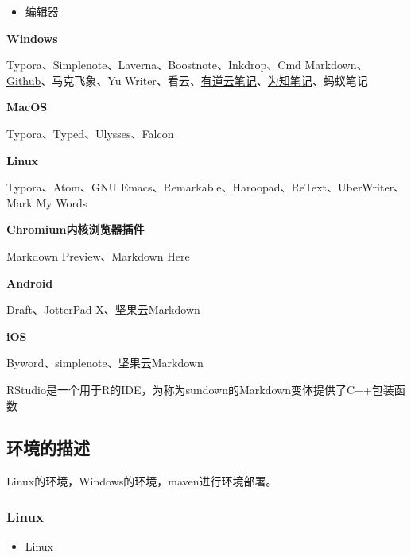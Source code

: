 \documentclass[
]{article}
\begin{document}
\begin{itemize}
\item
  编辑器
\end{itemize}

\textbf{Windows}

Typora、Simplenote、Laverna、Boostnote、Inkdrop、Cmd
Markdown、\href{https://baike.baidu.com/item/Github/10145341}{Github}、马克飞象、Yu
Writer、看云、\href{https://baike.baidu.com/item/有道云笔记/3689874}{有道云笔记}、\href{https://baike.baidu.com/item/为知笔记/552096}{为知笔记}、蚂蚁笔记

\textbf{MacOS}

Typora、Typed、Ulysses、Falcon

\textbf{Linux}

Typora、Atom、GNU Emacs、Remarkable、Haroopad、ReText、UberWriter、Mark
My Words

\textbf{Chromium内核浏览器插件}

Markdown Preview、Markdown Here

\textbf{Android}

Draft、JotterPad X、坚果云Markdown

\textbf{iOS}

Byword、simplenote、坚果云Markdown

RStudio是一个用于R的IDE，为称为sundown的Markdown变体提供了C++包装函数

\hypertarget{ux73afux5883ux7684ux63cfux8ff0}{%
\subsection{环境的描述}\label{ux73afux5883ux7684ux63cfux8ff0}}

Linux的环境，Windows的环境，maven进行环境部署。

\hypertarget{linux}{%
\subsubsection{Linux}\label{linux}}

\begin{itemize}
\item
  Linux
\end{itemize}
\end{document}
